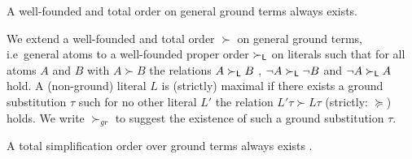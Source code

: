 \begin{lemma}A well-founded and total order on general ground terms always exists.\end{lemma}

	\begin{definition}\label{def:orders-on-literals}
		We extend a well-founded and total order $\succ$ on general ground terms,
		i.e~general atoms to a well-founded proper order $\succ_{\mathsf{L}}$
		on literals such that for all atoms $A$ and $B$ with $A\succ B$
		the relations $A\succ_{\mathsf{L}} B$ ,
		$\lnot A\succ_{\mathsf{L}}\lnot B$ and
		$\lnot A\succ_{\mathsf{L}} A$ hold.
		A (non-ground) literal $L$ is {\myem (strictly) maximal} if there exists a ground substitution $\tau$
		such for no other literal $L'$ the relation $L'\tau\succ L\tau$ (strictly: $\succcurlyeq$) holds.
		We write $\succ_{gr}$ to suggest the existence of such a ground substitution $\tau$.
	\end{definition}
%

%
\begin{lemma}
    A total simplification order
    over ground terms always exists \cite{NR2001}.
\end{lemma}

